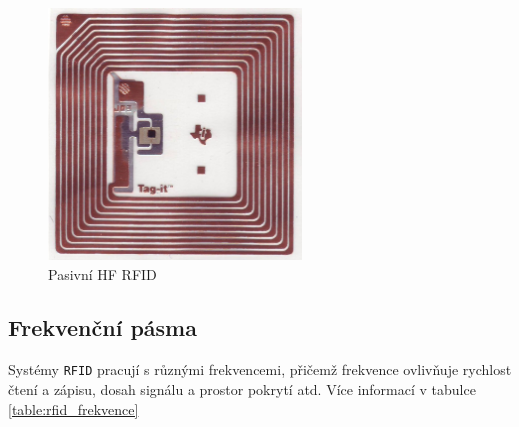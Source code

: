 \documentclass[czech,BP]{thesiskiv}
\begin{document}
\begin{figure}[H]
   		 	\centering
			\includegraphics[width=0.6\textwidth]{../images/rfid_smart_label.jpg}	
			\caption{Pasivní HF RFID}
    		\label{fig:rfidsmartlabel}
		\end{figure}


\subsection{Frekvenční pásma}
Systémy \texttt{RFID} pracují s různými frekvencemi, přičemž frekvence ovlivňuje rychlost čtení a zápisu, dosah signálu a prostor pokrytí atd.
Více informací v tabulce \ref{table:rfid_frekvence}
\end{document}
